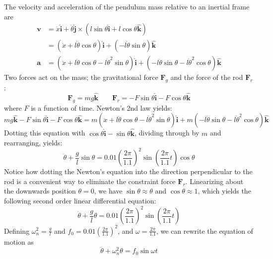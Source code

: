 \documentclass[letter, 11pt]{article}
\begin{document}
The velocity and acceleration of the pendulum mass relative to an inertial
frame are
\begin{align*}
\mathbf{v} &= \dot{x}\hat{\mathbf{i}} + \dot{\theta} \hat{\mathbf{j}} \times \left(l
\sin \theta \hat{\mathbf{i}} + l \cos \theta \hat{\mathbf{k}}\right)\\
&= \left(\dot{x} + l \dot{\theta} \cos \theta \right)\hat{\mathbf{i}} +
\left(-l \dot{\theta} \sin \theta \right) \hat{\mathbf{k}} \\
\mathbf{a} &= (\ddot{x} + l \ddot{\theta} \cos \theta - l \dot{\theta}^2 \sin
\theta) \hat{\mathbf{i}} + (-l \ddot{\theta} \sin \theta - l \dot{\theta}^2
\cos\theta)\hat{\mathbf{k}}
\end{align*}
Two forces act on the mass; the gravitational force $\mathbf{F}_g$ and the force
of the rod $\mathbf{F}_r$:
\[
\mathbf{F}_g = mg\hat{\mathbf{k}} \qquad \mathbf{F}_r = - F \sin \theta
\hat{\mathbf{i}} - F \cos \theta \hat{\mathbf{k}}
\]
where $F$ is a function of time.  Newton's 2nd law yields:
\[
mg\hat{\mathbf{k}} - F \sin \theta \hat{\mathbf{i}} - F \cos \theta
\hat{\mathbf{k}} = m (\ddot{x} + l \ddot{\theta} \cos \theta - l \dot{\theta}^2 \sin
\theta) \hat{\mathbf{i}} + m (-l \ddot{\theta} \sin \theta - l \dot{\theta}^2
\cos\theta)\hat{\mathbf{k}}
\]
Dotting this equation with $\cos\theta\hat{\mathbf{i}} - \sin \theta \hat{\mathbf{k}}$, dividing
through by $m$ and rearranging, yields:
\[
\ddot{\theta} + \frac{g}{l} \sin \theta =
0.01\left(\frac{2\pi}{1.1}\right)^2\sin\left(\frac{2\pi}{1.1}t\right) \cos
\theta
\]
Notice how dotting the Newton's equation into the direction perpendicular to
the rod is a convenient way to eliminate the constraint force
$\mathbf{F}_r$. Linearizing about the downwards position $\theta = 0$, we have
$\sin \theta \approx \theta$ and $\cos \theta \approx 1$, which yields the
following second order linear differential equation:
\[
\ddot{\theta} + \frac{g}{l} \theta =
0.01\left(\frac{2\pi}{1.1}\right)^2\sin\left(\frac{2\pi}{1.1}t\right)
\]
Defining $\omega_n^2 = \frac{g}{l}$ and $f_0 =
0.01\left(\frac{2\pi}{1.1}\right)^2$, and $\omega = \frac{2\pi}{1.1}$, we can
rewrite the equation of motion as
\[
\ddot{\theta} + \omega_n^2 \theta = f_0 \sin \omega t
\]
\end{document}
